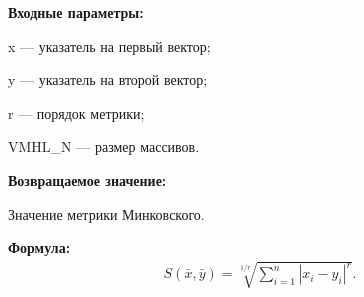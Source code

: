 \textbf{Входные параметры:}
 
x --- указатель на первый вектор;
 
y --- указатель на второй вектор;

r --- порядок метрики;
 
VMHL\_N --- размер массивов.

\textbf{Возвращаемое значение:}
 
Значение метрики Минковского.

\textbf{Формула:}
\begin{eqnarray*}
S\left( \bar{x}, \bar{y}\right)=\sqrt[1/r]{\sum_{i=1}^n {\left| x_i-y_i \right|}^r}   .
\end{eqnarray*}
